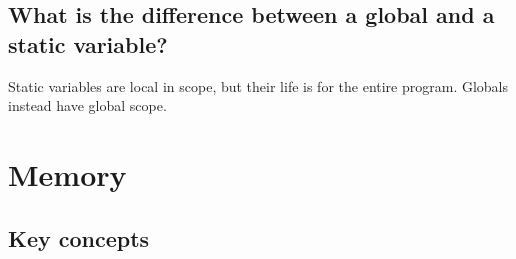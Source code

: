 \documentclass[a4paper]{article}
\begin{document}
\subsection{What is the difference between a global and a static variable?} %
\label{sub:What is the difference between a global and a static variable}
Static variables are local in scope, but their life is for the entire program. Globals instead have global scope. 
\section{Memory} %
\label{sec:Memory}
\subsection{Key concepts} %
\label{sub:Key concepts}
\end{document}
